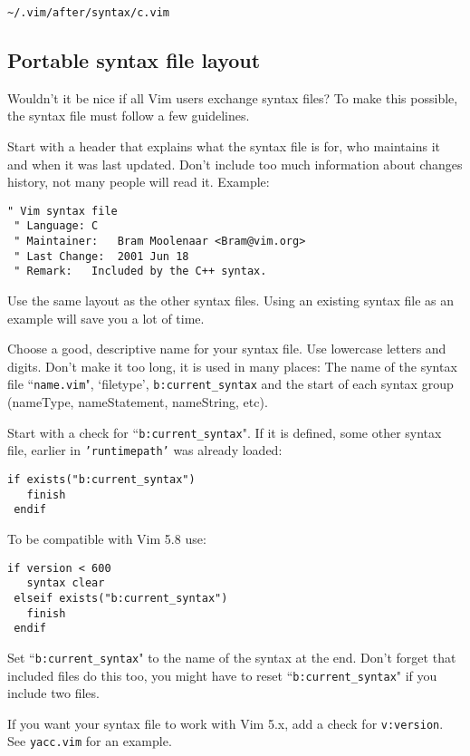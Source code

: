 \begin{Verbatim}[samepage=true]
    ~/.vim/after/syntax/c.vim 
\end{Verbatim}
\subsection{Portable syntax file layout}
Wouldn't it be nice if all Vim users exchange syntax files?  To make this possible, the syntax file must follow a few guidelines.

Start with a header that explains what the syntax file is for, who maintains it and when it was last updated.
Don't include too much information about changes history, not many people will read it.
Example:

\begin{Verbatim}[samepage=true]
 " Vim syntax file
 " Language: C
 " Maintainer:   Bram Moolenaar <Bram@vim.org>
 " Last Change:  2001 Jun 18
 " Remark:   Included by the C++ syntax.
\end{Verbatim}

Use the same layout as the other syntax files.
Using an existing syntax file as an example will save you a lot of time.

Choose a good, descriptive name for your syntax file.
Use lowercase letters and digits.
Don't make it too long, it is used in many places: The name of the syntax file ``\texttt{name.vim}", `filetype', \texttt{b:current\_syntax} and the start of each syntax group (nameType, nameStatement, nameString, etc).

Start with a check for ``\texttt{b:current\_syntax}".
If it is defined, some other syntax file, earlier in \texttt{'runtimepath'} was already loaded:

\begin{Verbatim}[samepage=true]
 if exists("b:current_syntax")
   finish
 endif
\end{Verbatim}

To be compatible with Vim 5.8 use:

\begin{Verbatim}[samepage=true]
 if version < 600
   syntax clear
 elseif exists("b:current_syntax")
   finish
 endif
\end{Verbatim}

Set ``\texttt{b:current\_syntax}" to the name of the syntax at the end.
Don't forget that included files do this too, you might have to reset ``\texttt{b:current\_syntax}" if you include two files.

If you want your syntax file to work with Vim 5.x, add a check for \texttt{v:version}.
See \texttt{yacc.vim} for an example.

